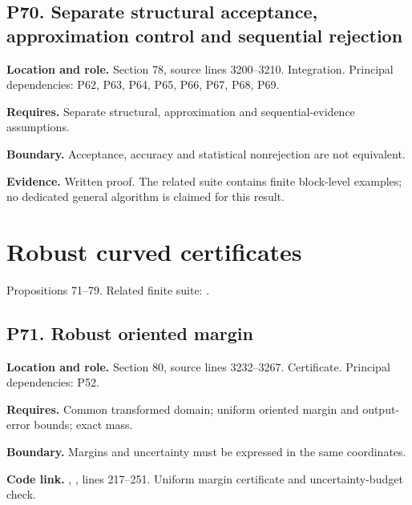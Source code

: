 \documentclass[11pt,oneside,openany]{book}
\numberwithin{equation}{section}
\begin{document}
\par\noindent\begin{minipage}{\textwidth}
\subsection{P70. Separate structural acceptance, approximation control
and sequential
rejection}\label{LSMRegister:p70.-separate-structural-acceptance-approximation-control-and-sequential-rejection}

\textbf{Location and role.} Section 78, source lines 3200--3210.
Integration. Principal dependencies: P62, P63, P64, P65, P66, P67, P68,
P69.

\textbf{Requires.} Separate structural, approximation and
sequential-evidence assumptions.

\textbf{Boundary.} Acceptance, accuracy and statistical nonrejection are
not equivalent.

\textbf{Evidence.} Written proof. The related suite contains finite
block-level examples; no dedicated general algorithm is claimed for this
result.
\end{minipage}\par\medskip


\section{Robust curved certificates}\label{LSMRegister:robust-curved-certificates}

Propositions 71--79. Related finite suite:
.

\par\noindent\begin{minipage}{\textwidth}
\subsection{P71. Robust oriented
margin}\label{LSMRegister:p71.-robust-oriented-margin}

\textbf{Location and role.} Section 80, source lines 3232--3267.
Certificate. Principal dependencies: P52.

\textbf{Requires.} Common transformed domain; uniform oriented margin
and output-error bounds; exact mass.

\textbf{Boundary.} Margins and uncertainty must be expressed in the same
coordinates.

\textbf{Code link.} ,
, lines 217--251. Uniform margin certificate
and uncertainty-budget check.
\end{minipage}\par\medskip
\end{document}
